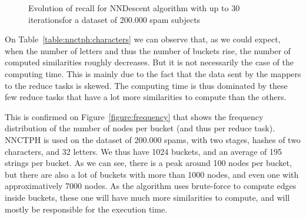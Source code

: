 \documentclass[wcp]{jmlr}
\begin{document}
\begin{figure}[ht]
  \centering


\caption{Evolution of recall for NNDescent algorithm with up to 30 iterations\newline for a dataset of 200.000 spam subjects}
\label{figure:nndescent-30}
\end{figure}

On Table~\ref{table:nnctph:characters} we can observe that, as we could expect, when the number of letters and thus the number of buckets rise, the number of computed similarities roughly decreases. But it is not necessarily the case of the computing time. This is mainly due to the fact that the data sent by the mappers to the reduce tasks is skewed. The computing time is thus dominated by these few reduce tasks that have a lot more similarities to compute than the others.

This is confirmed on Figure~\ref{figure:frequency} that shows the frequency distribution of the number of nodes per bucket (and thus per reduce task). NNCTPH is used on the dataset of 200.000 spams, with two stages, hashes of two characters, and 32 letters. We thus have 1024 buckets, and an average of 195 strings per bucket. As we can see, there is a peak around 100 nodes per bucket, but there are also a lot of buckets with more than 1000 nodes, and even one with approximatively 7000 nodes. As the algorithm uses brute-force to compute edges inside buckets, these one will have much more similarities to compute, and will mostly be responsible for the execution time.
\end{document}
